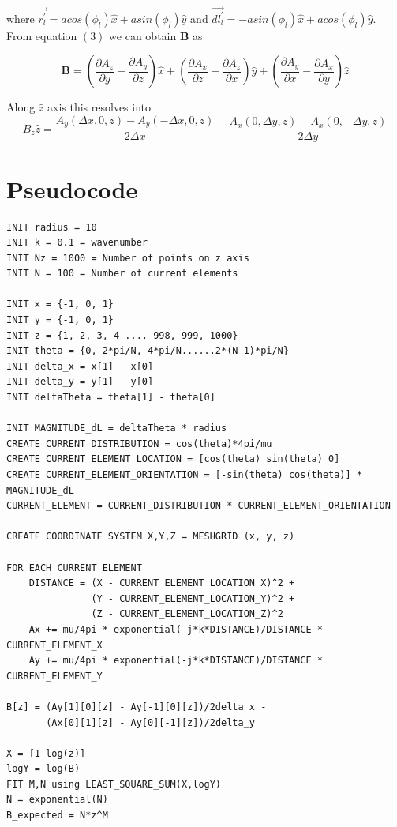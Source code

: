 \documentclass[12pt, a4paper]{report}
\begin{document}
where $\vec{r^{'}_l} = acos(\phi_l)\hat{x} + asin(\phi_l)\hat{y}$ and $\vec{dl^{'}_l} = -asin(\phi_l)\hat{x} + acos(\phi_l)\hat{y}$. From equation $(3)$ we can obtain \textbf{B} as

\begin{equation*}
\mathbf{B} = (\frac{\partial A_z}{\partial y} - \frac{\partial A_y}{\partial z})\hat{x} + (\frac{\partial A_x}{\partial z} - \frac{\partial A_z}{\partial x})\hat{y} + (\frac{\partial A_y}{\partial x} - \frac{\partial A_x}{\partial y})\hat{z}
\end{equation*}

Along $\hat{z}$ axis this resolves into
\begin{equation}
B_z \hat{z} = \frac{A_y(\Delta x,0,z) - A_y(-\Delta x,0,z)}{2 \Delta x} - \frac{A_x(0,\Delta y,z) - A_x(0,-\Delta y,z)}{2 \Delta y}
\end{equation}

\clearpage
\section*{Pseudocode}

\begin{verbatim}
INIT radius = 10
INIT k = 0.1 = wavenumber
INIT Nz = 1000 = Number of points on z axis
INIT N = 100 = Number of current elements

INIT x = {-1, 0, 1}
INIT y = {-1, 0, 1}
INIT z = {1, 2, 3, 4 .... 998, 999, 1000}
INIT theta = {0, 2*pi/N, 4*pi/N......2*(N-1)*pi/N}
INIT delta_x = x[1] - x[0]
INIT delta_y = y[1] - y[0]
INIT deltaTheta = theta[1] - theta[0]

INIT MAGNITUDE_dL = deltaTheta * radius
CREATE CURRENT_DISTRIBUTION = cos(theta)*4pi/mu
CREATE CURRENT_ELEMENT_LOCATION = [cos(theta) sin(theta) 0]
CREATE CURRENT_ELEMENT_ORIENTATION = [-sin(theta) cos(theta)] * MAGNITUDE_dL
CURRENT_ELEMENT = CURRENT_DISTRIBUTION * CURRENT_ELEMENT_ORIENTATION

CREATE COORDINATE SYSTEM X,Y,Z = MESHGRID (x, y, z)

FOR EACH CURRENT_ELEMENT
    DISTANCE = (X - CURRENT_ELEMENT_LOCATION_X)^2 + 
               (Y - CURRENT_ELEMENT_LOCATION_Y)^2 +
               (Z - CURRENT_ELEMENT_LOCATION_Z)^2 
    Ax += mu/4pi * exponential(-j*k*DISTANCE)/DISTANCE * CURRENT_ELEMENT_X
    Ay += mu/4pi * exponential(-j*k*DISTANCE)/DISTANCE * CURRENT_ELEMENT_Y
    
B[z] = (Ay[1][0][z] - Ay[-1][0][z])/2delta_x - 
       (Ax[0][1][z] - Ay[0][-1][z])/2delta_y

X = [1 log(z)]
logY = log(B)
FIT M,N using LEAST_SQUARE_SUM(X,logY)
N = exponential(N)
B_expected = N*z^M
\end{verbatim}
\clearpage
\end{document}
